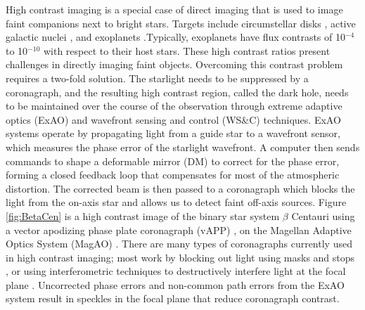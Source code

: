 High contrast imaging is a special case of direct imaging that is used to image faint companions next to bright stars. Targets include circumstellar disks \citep{rodigas2014morphology}, active galactic nuclei \citep{imanishi2020subaru}, and exoplanets \citep{bowler2016imaging}.Typically, exoplanets have flux contrasts of 10$^{-4}$ to 10$^{-10}$ with respect to their host stars. These high contrast ratios present challenges in directly imaging faint objects. Overcoming this contrast problem requires a two-fold solution. The starlight needs to be suppressed by a coronagraph, and the resulting high contrast region, called the dark hole, needs to be maintained over the course of the observation through extreme adaptive optics (ExAO) and wavefront sensing and control (WS$\&$C) techniques. ExAO systems operate by propagating light from a guide star to a wavefront sensor, which measures the phase error of the starlight wavefront. A computer then sends commands to shape a deformable mirror (DM) to correct for the phase error, forming a closed feedback loop that compensates for most of the atmospheric distortion. The corrected beam is then passed to a coronagraph which blocks the light from the on-axis star and allows us to detect faint off-axis sources. Figure \ref{fig:BetaCen} is a high contrast image of the binary star system $\beta$ Centauri using a vector apodizing phase plate coronagraph (vAPP) \citep{snik2012vector}, on the Magellan Adaptive Optics System (MagAO) \citep{close2018status}. There are many types of coronagraphs currently used in high contrast imaging; most work by blocking out light using masks and stops \citep{soummer2004apodized}, or using interferometric techniques to destructively interfere light at the focal plane \citep{foo2005optical}. Uncorrected phase errors and non-common path errors from the ExAO system result in speckles in the focal plane that reduce coronagraph contrast.
 

